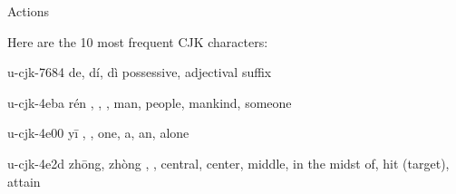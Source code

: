




\vspace{\myLineheight}\begin{multicols}{2}\raggedcolumns{}

\end{multicols}


{\mktsHTwo{}Actions\mktsHTwoBeg}%


\vspace{\myLineheight}\begin{multicols}{2}\raggedcolumns{}Here are the 10 most frequent CJK characters:



\lettrine[lines=3]{\cjkgGlue{}}{}\begin{minipage}{0.8\linewidth} u-cjk-7684  de, dí, dì  \cjkgGlue{} \cjkgGlue{} possessive, adjectival suffix \end{minipage}

\lettrine[lines=3]{\cjkgGlue{}}{}\begin{minipage}{0.8\linewidth} u-cjk-4eba  rén  \cjkgGlue{}, \cjkgGlue{}, \cjkgGlue{} \cjkgGlue{}, \cjkgGlue{} man, people, mankind, someone \end{minipage}

\lettrine[lines=3]{\cjkgGlue{}}{}\begin{minipage}{0.8\linewidth} u-cjk-4e00  yī  \cjkgGlue{}, \cjkgGlue{} \cjkgGlue{}, \cjkgGlue{} one, a, an, alone \end{minipage}

\lettrine[lines=3]{\cjkgGlue{}}{}\begin{minipage}{0.8\linewidth} u-cjk-4e2d  zhōng, zhòng  \cjkgGlue{}, \cjkgGlue{}, \cjkgGlue{} \cjkgGlue{} central, center, middle, in the midst of, hit (target), attain \end{minipage}


\end{multicols}
